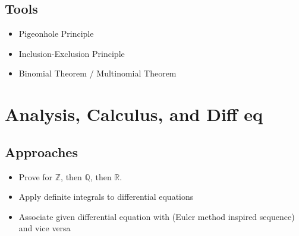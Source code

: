 \documentclass[12pt]{amsart}
\begin{document}
\begin{multicols}{2}
\subsection{Tools}
\begin{itemize}
    \item Pigeonhole Principle
    \item Inclusion-Exclusion Principle
    \item Binomial Theorem / Multinomial Theorem
\end{itemize}

\section{Analysis, Calculus, and Diff eq}
\subsection{Approaches}
\begin{itemize}
    \item Prove for $\mathbb{Z}$, then $\mathbb{Q}$, then $\mathbb{R}$.
    \item Apply definite integrals to differential equations
    \item Associate given differential equation with (Euler method inspired
        sequence) and vice versa
\end{itemize}

\end{multicols}
\end{document}
